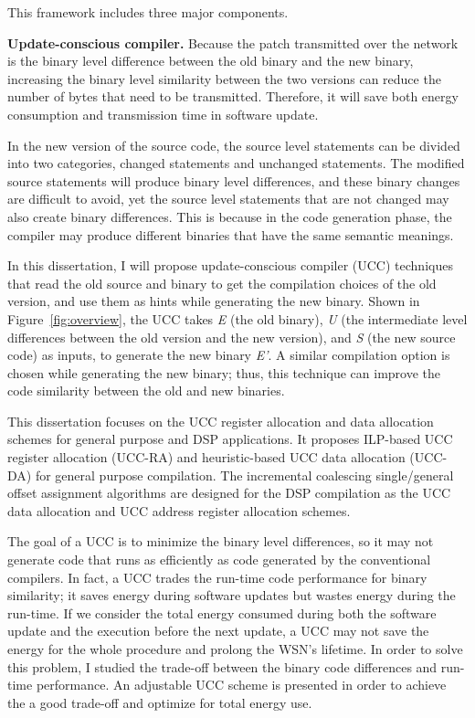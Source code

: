 This framework includes three major components.

\textbf{Update-conscious compiler.} 
Because the patch transmitted over the network is the binary level difference between the old binary and the new  binary, increasing the binary level similarity between the two versions can reduce the number of bytes that need to be transmitted. Therefore, it will save both energy consumption and transmission time in software update. 


In the new version of the source code, the source level statements can be divided into two categories, changed statements and unchanged statements.  The modified source statements will produce binary level differences, and these binary changes are difficult to avoid, yet the source level statements that are not changed may also create binary differences.
This is because in the code generation phase, the compiler may produce different binaries that have the same semantic meanings.

In this dissertation, I will propose update-conscious compiler (UCC) techniques that read the old source and binary to get the compilation choices of the old version, and use them as hints while generating the new binary. 
Shown in Figure~\ref{fig:overview}, the UCC takes {\it E} (the old binary), {\it U} (the intermediate level differences between the old version and the new version), and {\it S} (the new source code) as inputs, to generate the new binary {\it E'}. A similar compilation option is chosen while generating the new binary; thus, this technique can improve the code similarity between the old and new binaries.

This dissertation focuses on the UCC register allocation and data allocation schemes for general purpose and DSP applications.
It proposes ILP-based UCC register allocation (UCC-RA) and heuristic-based UCC data allocation (UCC-DA) for general purpose compilation.
The incremental coalescing single/general offset assignment algorithms are designed for the DSP compilation as the UCC data allocation and UCC address register allocation schemes.

The goal of a UCC is to minimize the binary level differences, so it may not generate code that runs as efficiently as code generated by the conventional compilers.
In fact, a UCC trades the run-time code performance for binary similarity; it saves energy during software updates but wastes energy during the run-time.
If we consider the total energy consumed during both the software update and the execution before the next update, a UCC may not save the energy for the whole procedure and prolong the WSN's lifetime.
In order to solve this problem, I studied the trade-off between the binary code differences and run-time performance. An adjustable UCC scheme is presented in order to achieve the a good trade-off and optimize for total energy use.
	
